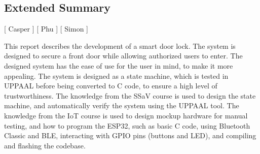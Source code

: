 \subsection*{Extended Summary}\label{sec:ExtendedSummary}
[ Casper ] [ Phu ] [ Simon ] 
\newline

This report describes the development of a smart door lock.
The system is designed to secure a front door while allowing authorized users to enter.
The designed system has the ease of use for the user in mind, to make it more appealing.
The system is designed as a state machine, which is tested in UPPAAL before being converted to C code, to ensure a high level of trustworthiness.
The knowledge from the SSaV course is used to design the state machine, and automatically verify the system using the UPPAAL tool.
The knowledge from the IoT course is used to design mockup hardware for manual testing, and how to program the ESP32, such as basic C code, using Bluetooth Classic and BLE, interacting with GPIO pins (buttons and LED), and compiling and flashing the codebase.